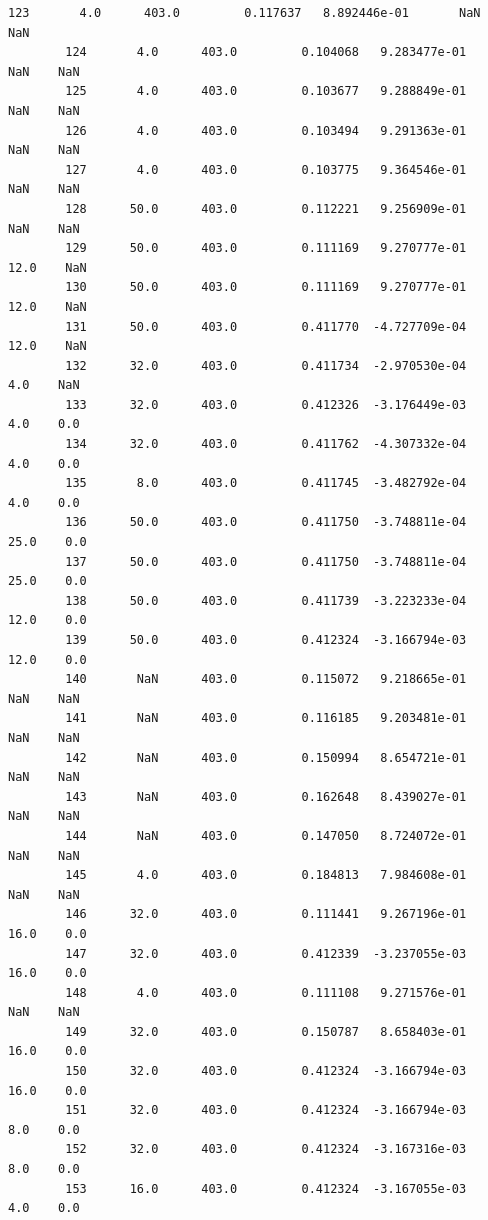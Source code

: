 \documentclass[11pt, a4paper , landscape]{article}
\begin{document}
\begin{Verbatim}[commandchars=\\\{\}]
        123       4.0      403.0         0.117637   8.892446e-01       NaN    NaN  
        124       4.0      403.0         0.104068   9.283477e-01       NaN    NaN  
        125       4.0      403.0         0.103677   9.288849e-01       NaN    NaN  
        126       4.0      403.0         0.103494   9.291363e-01       NaN    NaN  
        127       4.0      403.0         0.103775   9.364546e-01       NaN    NaN  
        128      50.0      403.0         0.112221   9.256909e-01       NaN    NaN  
        129      50.0      403.0         0.111169   9.270777e-01      12.0    NaN  
        130      50.0      403.0         0.111169   9.270777e-01      12.0    NaN  
        131      50.0      403.0         0.411770  -4.727709e-04      12.0    NaN  
        132      32.0      403.0         0.411734  -2.970530e-04       4.0    NaN  
        133      32.0      403.0         0.412326  -3.176449e-03       4.0    0.0  
        134      32.0      403.0         0.411762  -4.307332e-04       4.0    0.0  
        135       8.0      403.0         0.411745  -3.482792e-04       4.0    0.0  
        136      50.0      403.0         0.411750  -3.748811e-04      25.0    0.0  
        137      50.0      403.0         0.411750  -3.748811e-04      25.0    0.0  
        138      50.0      403.0         0.411739  -3.223233e-04      12.0    0.0  
        139      50.0      403.0         0.412324  -3.166794e-03      12.0    0.0  
        140       NaN      403.0         0.115072   9.218665e-01       NaN    NaN  
        141       NaN      403.0         0.116185   9.203481e-01       NaN    NaN  
        142       NaN      403.0         0.150994   8.654721e-01       NaN    NaN  
        143       NaN      403.0         0.162648   8.439027e-01       NaN    NaN  
        144       NaN      403.0         0.147050   8.724072e-01       NaN    NaN  
        145       4.0      403.0         0.184813   7.984608e-01       NaN    NaN  
        146      32.0      403.0         0.111441   9.267196e-01      16.0    0.0  
        147      32.0      403.0         0.412339  -3.237055e-03      16.0    0.0  
        148       4.0      403.0         0.111108   9.271576e-01       NaN    NaN  
        149      32.0      403.0         0.150787   8.658403e-01      16.0    0.0  
        150      32.0      403.0         0.412324  -3.166794e-03      16.0    0.0  
        151      32.0      403.0         0.412324  -3.166794e-03       8.0    0.0  
        152      32.0      403.0         0.412324  -3.167316e-03       8.0    0.0  
        153      16.0      403.0         0.412324  -3.167055e-03       4.0    0.0  

\end{Verbatim}
\end{document}
